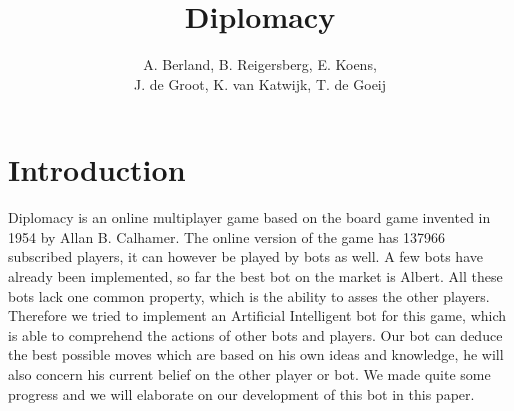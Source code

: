 \documentclass[a4paper]{article} %
\title{Diplomacy}
\author{A. Berland, B. Reigersberg, E. Koens, \\J. de Groot, K. van Katwijk, T. de Goeij}
\begin{document}
\maketitle
\tableofcontents
\newpage

\section{Introduction}
Diplomacy is an online multiplayer game based on the board game invented in 1954 by Allan B. Calhamer. The online version of the game has 137966 subscribed players, it can however be played by bots as well. A few bots have already been implemented, so far the best bot on the market is Albert. All these bots lack one common property, which is the ability to asses the other players. Therefore we tried to implement an Artificial Intelligent bot for this game, which is able to comprehend the actions of other bots and players. Our bot can deduce the best possible moves which are based on his own ideas and knowledge, he will also concern his current belief on the other player or bot. We made quite some progress and we will elaborate on our development of this bot in this paper.
\end{document}
